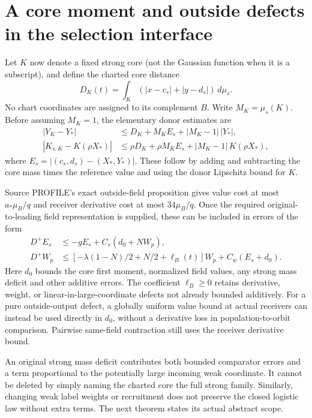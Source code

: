 \documentclass[11pt]{article}
\theoremstyle{remark}\newtheorem{remark}[theorem]{Remark}
\newcommand{\dd}{\,d}\newcommand{\E}{\mathbb E}
\begin{document}
\section{A core moment and outside defects in the selection interface}
Let $K$ now denote a fixed strong core (not the Gaussian function when it is a subscript), and define the charted core distance
\[
 D_K(t)=\int_K(|x-c_s|+|y-d_s|)\dd\mu_s.
\]
No chart coordinates are assigned to its complement $B$. Write $M_K=\mu_s(K)$. Before assuming $M_K=1$, the elementary donor estimates are
\begin{align*}
 |Y_K-Y_*|&\le D_K+M_K E_s+|M_K-1|\,|Y_*|,\\
 |K_{s,K}-K(\rho X_*)|&\le\rho D_K+\rho M_K E_s
                  +|M_K-1|\,K(\rho X_*),
\end{align*}
where $E_s=|(c_s,d_s)-(X_*,Y_*)|$. These follow by adding and subtracting the core mass times the reference value and using the donor Lipschitz bound for $K$.

Source PROFILE's exact outside-field proposition gives value cost at most $a_*\mu_B/q$ and receiver derivative cost at most $34\mu_B/q$. Once the required original-to-leading field representation is supplied, these can be included in errors of the form
\begin{align}
 D^+E_s&\le-gE_s+C_s(d_0+NW_p),\label{inc:AN03:tailrepair:v1:strongerror}\\
 D^+W_p&\le[-\lambda(1-N)/2+N/2+\ell_B(t)]W_p
                         +C_w(E_s+d_0).
 \label{inc:AN03:tailrepair:v1:weakerror}
\end{align}
Here $d_0$ bounds the core first moment, normalized field values, any strong mass deficit and other additive errors. The coefficient $\ell_B\ge0$ retains derivative, weight, or linear-in-large-coordinate defects not already bounded additively. For a pure outside-output defect, a globally uniform value bound at actual receivers can instead be used directly in $d_0$, without a derivative loss in population-to-orbit comparison. Pairwise same-field contraction still uses the receiver derivative bound.

An original strong mass deficit contributes both bounded comparator errors and a term proportional to the potentially large incoming weak coordinate. It cannot be deleted by simply naming the charted core the full strong family. Similarly, changing weak label weights or recruitment does not preserve the closed logistic law without extra terms. The next theorem states its actual abstract scope.
\end{document}
